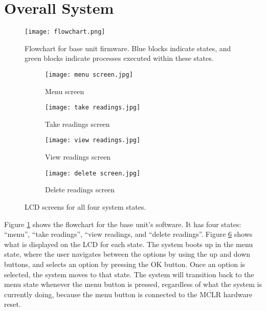 \section{Overall System}
\begin{figure}[htb]
	\centering
	\texttt{[image: flowchart.png]}
	\caption{Flowchart for base unit firmware. Blue blocks indicate states, and green blocks indicate processes executed within these states.}
	\label{fig: flowchart}
\end{figure}

\begin{figure}[htb]
	\centering
	\begin{subfigure}[b]{0.4\linewidth}
		\texttt{[image: menu screen.jpg]}
		\caption{Menu screen}
		\label{fig: menu screen}
	\end{subfigure}
	\begin{subfigure}[b]{0.4\linewidth}
		\texttt{[image: take readings.jpg]}
		\caption{Take readings screen}
		\label{fig: take readings screen}
	\end{subfigure}
	\begin{subfigure}[b]{0.4\linewidth}
		\texttt{[image: view readings.jpg]}
		\caption{View readings screen}
		\label{fig: view readings screen}
	\end{subfigure}
	\begin{subfigure}[b]{0.4\linewidth}
		\texttt{[image: delete screen.jpg]}
		\caption{Delete readings screen}
		\label{fig: delete readings screen}
	\end{subfigure}
	\caption{LCD screens for all four system states.}
	\label{fig: lcd screens}
\end{figure}

Figure \ref{fig: flowchart} shows the flowchart for the base unit's software. It has four states: ``menu'', ``take readings'', ``view readings, and ``delete readings''. Figure \ref{fig: lcd screens} shows what is displayed on the LCD for each state. The system boots up in the menu state, where the user navigates between the options by using the up and down buttons, and selects an option by pressing the OK button. Once an option is selected, the system moves to that state. The system will transition back to the menu state whenever the menu button is pressed, regardless of what the system is currently doing, because the menu button is connected to the $\overline{\text{MCLR}}$ hardware reset.\\

